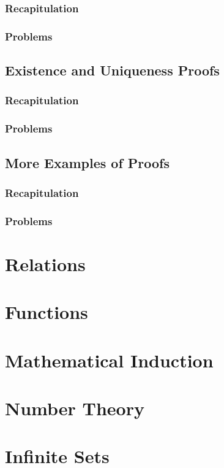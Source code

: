 \documentclass{report}
\begin{document}
        \subsection{Recapitulation}
        \subsection{Problems}
    \section{Existence and Uniqueness Proofs}
        \subsection{Recapitulation}
        \subsection{Problems}
    \section{More Examples of Proofs}
        \subsection{Recapitulation}
        \subsection{Problems}

\chapter{Relations}

\chapter{Functions}

\chapter{Mathematical Induction}

\chapter{Number Theory}

\chapter{Infinite Sets}
\end{document}
